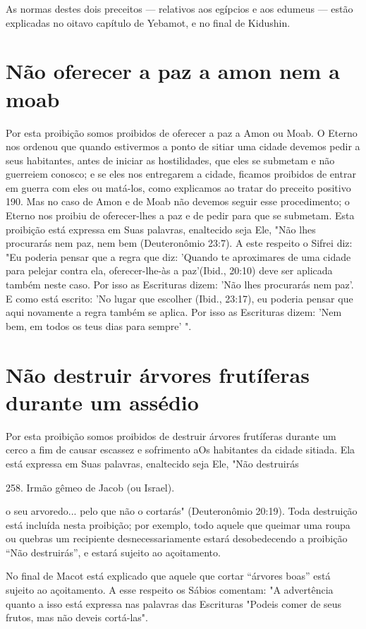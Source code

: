 As normas destes dois preceitos --- relativos aos egípcios e aos
edu­meus --- estão explicadas no oitavo capítulo de Yebamot, e no final
de Kidushin.

\section{Não oferecer a paz a amon nem a moab}

Por esta proibição somos proibidos de oferecer a paz a Amon ou Moab. O
Eterno nos ordenou que quando estivermos a ponto de sitiar uma ci­dade
devemos pedir a seus habitantes, antes de iniciar as hostilidades, que
eles se submetam e não guerreiem conosco; e se eles nos entregarem a
cidade, fica­mos proibidos de entrar em guerra com eles ou matá-los,
como explicamos ao tratar do preceito positivo 190. Mas no caso de Amon
e de Moab não devemos seguir esse procedimento; o Eterno nos proibiu de
oferecer-lhes a paz e de pe­dir para que se submetam. Esta proibição
está expressa em Suas palavras, enal­tecido seja Ele, "Não lhes
procurarás nem paz, nem bem (Deuteronômio 23:7). A este respeito o
Sifrei diz: "Eu poderia pensar que a regra que diz: 'Quando te
aproximares de uma cidade para pelejar contra ela, oferecer-lhe-às a
paz'(Ibid., 20:10) deve ser aplicada também neste caso. Por isso as
Escrituras dizem: 'Não lhes procurarás nem paz'. E como está escrito:
'No lugar que escolher (Ibid., 23:17), eu poderia pensar que aqui
novamente a regra também se aplica. Por isso as Escrituras dizem: 'Nem
bem, em todos os teus dias para sempre' ".


\section{Não destruir árvores frutíferas durante um assédio}


Por esta proibição somos proibidos de destruir árvores frutíferas
du­rante um cerco a fim de causar escassez e sofrimento aOs habitantes
da cidade sitiada. Ela está expressa em Suas palavras, enaltecido seja
Ele, "Não destruirás

258. Irmão gêmeo de Jacob (ou Israel).

o seu arvoredo... pelo que não o cortarás" (Deuteronômio 20:19). Toda
des­truição está incluída nesta proibição; por exemplo, todo aquele que
queimar uma roupa ou quebras um recipiente desnecessariamente estará
desobedecen­do a proibição ``Não destruirás'', e estará sujeito ao
açoitamento.

No final de Macot está explicado que aquele que cortar ``árvores boas''
está sujeito ao açoitamento. A esse respeito os Sábios comentam: "A
ad­vertência quanto a isso está expressa nas palavras das Escrituras
"Podeis comer de seus frutos, mas não deveis cortá-las".

